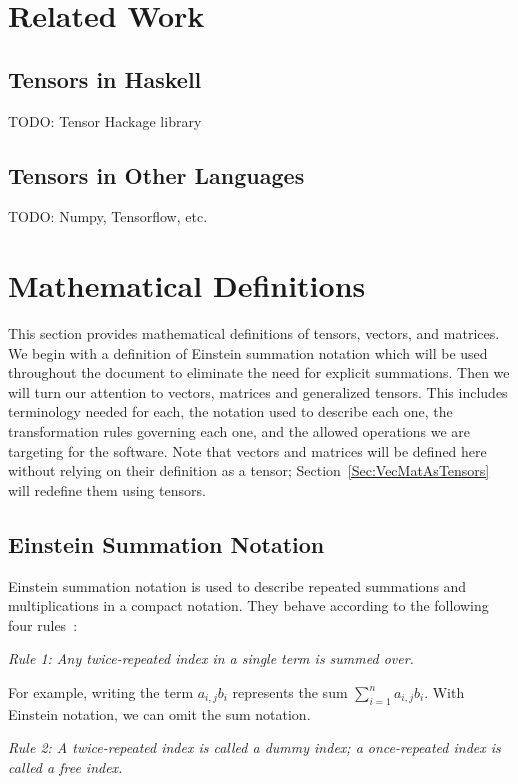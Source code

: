 \documentclass[12pt]{article}
\begin{document}
\section{Related Work}\label{Sec:RelatedWork}

\subsection{Tensors in Haskell}
TODO: Tensor Hackage library

\subsection{Tensors in Other Languages}
TODO: Numpy, Tensorflow, etc.

\section{Mathematical Definitions}\label{Sec:MathematicalDefinitions}
This section provides mathematical definitions of tensors, vectors, and matrices. We
begin with a definition of Einstein summation notation which will be used throughout
the document to eliminate the need for explicit summations. Then we will turn our
attention to vectors, matrices and generalized tensors.
This includes terminology needed for each, the notation used to describe each one,
the transformation rules governing each one, and the allowed operations we are 
targeting for the software. Note that vectors and matrices will be defined here without
relying on their definition as a tensor; Section~\ref{Sec:VecMatAsTensors} will redefine
them using tensors.

\subsection{Einstein Summation Notation}

Einstein summation notation is used to describe repeated summations and multiplications
in a compact notation. They behave according to the following four rules~\citep{Khan2023}:

\medskip
\noindent\textit{Rule 1: Any twice-repeated index in a single term is summed over.}

\noindent For example, writing the term $a_{i,j}b_i$ represents the sum 
$\sum_{i=1}^n a_{i,j}b_i$. With Einstein notation, we can omit the sum notation.

\medskip
\noindent\textit{Rule 2: A twice-repeated index is called a dummy index; a 
once-repeated index is called a free index.}
\end{document}
